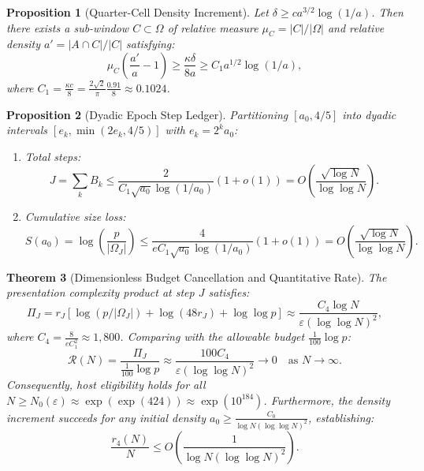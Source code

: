 \documentclass[11pt,reqno]{amsart}
\theoremstyle{plain}
\newtheorem{theorem}{Theorem}[section]
\newtheorem{proposition}[theorem]{Proposition}
\theoremstyle{definition}
\newcommand{\eps}{\varepsilon}
\begin{document}
\begin{proposition}[Quarter-Cell Density Increment]\label{prop:quarter_cell}
Let $\delta \ge c a^{3/2} \log(1/a)$.
Then there exists a sub-window $C \subset \Omega$ of relative measure $\mu_C = |C|/|\Omega|$ and relative density $a' = |A \cap C|/|C|$ satisfying:
\begin{equation}
\mu_C \left( \frac{a'}{a} - 1 \right) \ge \frac{\kappa \delta}{8a} \ge C_1 a^{1/2} \log(1/a),
\end{equation}
where $C_1 = \frac{\kappa c}{8} = \frac{2\sqrt{2}}{\pi} \frac{0.91}{8} \approx 0.1024$.
\end{proposition}

\begin{proposition}[Dyadic Epoch Step Ledger]\label{prop:epoch_ledger}
Partitioning $[a_0, 4/5]$ into dyadic intervals $[e_k, \min(2e_k, 4/5)]$ with $e_k = 2^k a_0$:
\begin{enumerate}
\item Total steps:
\begin{equation}
J = \sum_k B_k \le \frac{2}{C_1 \sqrt{a_0} \log(1/a_0)} (1 + o(1)) = O\left( \frac{\sqrt{\log N}}{\log\log N} \right).
\end{equation}
\item Cumulative size loss:
\begin{equation}
S(a_0) = \log\left( \frac{p}{|\Omega_J|} \right) \le \frac{4}{e C_1 \sqrt{a_0} \log(1/a_0)} (1 + o(1)) = O\left( \frac{\sqrt{\log N}}{\log\log N} \right).
\end{equation}
\end{enumerate}
\end{proposition}

\begin{theorem}[Dimensionless Budget Cancellation and Quantitative Rate]\label{thm:budget_cancellation}
The presentation complexity product at step $J$ satisfies:
\begin{equation}
\Pi_J = r_J \left[ \log(p / |\Omega_J|) + \log(48 r_J) + \log\log p \right] \approx \frac{C_4 \log N}{\eps (\log\log N)^2},
\end{equation}
where $C_4 = \frac{8}{e C_1^2} \approx 1,800$.
Comparing with the allowable budget $\frac{1}{100} \log p$:
\begin{equation}
\mathcal{R}(N) = \frac{\Pi_J}{\frac{1}{100} \log p} \approx \frac{100 C_4}{\eps (\log\log N)^2} \longrightarrow 0 \quad \text{as } N \to \infty.
\end{equation}
Consequently, host eligibility holds for all $N \ge N_0(\eps) \approx \exp(\exp(424)) \approx \exp(10^{184})$.
Furthermore, the density increment succeeds for any initial density $a_0 \ge \frac{C_0}{\log N (\log\log N)^2}$, establishing:
\begin{equation}
\frac{r_4(N)}{N} \le O\left( \frac{1}{\log N (\log\log N)^2} \right).
\end{equation}
\end{theorem}
\end{document}
